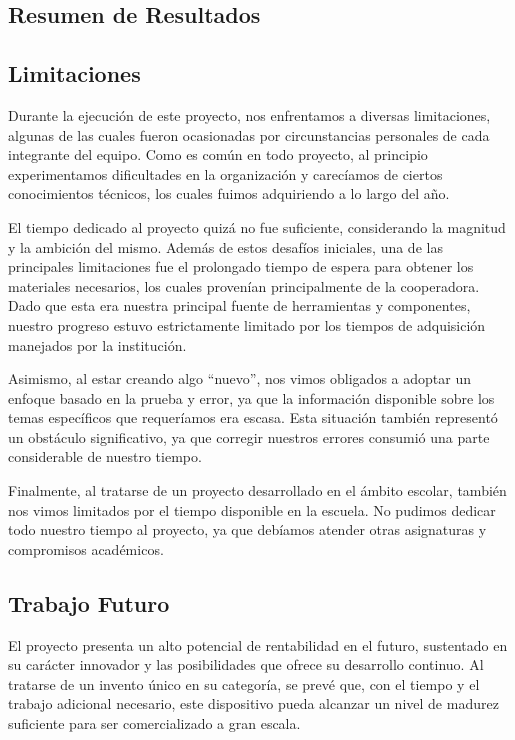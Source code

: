 \documentclass{article}
\begin{document}
\subsection{Resumen de Resultados}


\subsection{Limitaciones}
Durante la ejecución de este proyecto, nos enfrentamos a diversas limitaciones, algunas de las cuales fueron ocasionadas por circunstancias personales de cada integrante del equipo. Como es común en todo proyecto, al principio experimentamos dificultades en la organización y carecíamos de ciertos conocimientos técnicos, los cuales fuimos adquiriendo a lo largo del año.



El tiempo dedicado al proyecto quizá no fue suficiente, considerando la magnitud y la ambición del mismo. Además de estos desafíos iniciales, una de las principales limitaciones fue el prolongado tiempo de espera para obtener los materiales necesarios, los cuales provenían principalmente de la cooperadora. Dado que esta era nuestra principal fuente de herramientas y componentes, nuestro progreso estuvo estrictamente limitado por los tiempos de adquisición manejados por la institución.


Asimismo, al estar creando algo “nuevo”, nos vimos obligados a adoptar un enfoque basado en la prueba y error, ya que la información disponible sobre los temas específicos que requeríamos era escasa. Esta situación también representó un obstáculo significativo, ya que corregir nuestros errores consumió una parte considerable de nuestro tiempo.


Finalmente, al tratarse de un proyecto desarrollado en el ámbito escolar, también nos vimos limitados por el tiempo disponible en la escuela. No pudimos dedicar todo nuestro tiempo al proyecto, ya que debíamos atender otras asignaturas y compromisos académicos.

\subsection{Trabajo Futuro}
El proyecto presenta un alto potencial de rentabilidad en el futuro, sustentado en su carácter innovador y las posibilidades que ofrece su desarrollo continuo. Al tratarse de un invento único en su categoría, se prevé que, con el tiempo y el trabajo adicional necesario, este dispositivo pueda alcanzar un nivel de madurez suficiente para ser comercializado a gran escala.
\end{document}
